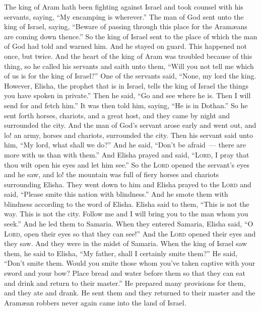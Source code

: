 \begin{inparaenum}
   The king of Aram hath been fighting against Israel and took counsel with his servants, saying, ``My encamping is wherever.''%
   The man of God sent unto the king of Israel, saying, ``Beware of passing through this place for the Aram\ae{}ans are coming down thence.''%
   So the king of Israel sent to the place of which the man of God had told and warned him. And he stayed on guard. This happened not once, but twice.%
   And the heart of the king of Aram was troubled because of this thing, so he called his servants and saith unto them, ``Will you not tell me which of us is for the king of Israel?''%
   One of the servants said, ``None, my lord the king. However, Elisha, the prophet that is in Israel, tells the king of Israel the things you have spoken in private.''%
   Then he said, ``Go and see where he is. Then I will send for and fetch him.'' It was then told him, saying, ``He is in Dothan.''%
   So he sent forth horses, chariots, and a great host, and they came by night and surrounded the city.%
   And the man of God's servant arose early and went out, and lo! an army, horses and chariots, surrounded the city. Then his servant said unto him, ``My lord, what shall we do?''%
   And he said, ``Don't be afraid~--- there are more with us than with them.''%
   And Elisha prayed and said, ``\textsc{Lord}, I pray that thou wilt open his eyes and let him see.'' So the \textsc{Lord} opened the servant's eyes and he saw, and lo! the mountain was full of fiery horses and chariots surrounding Elisha.%
   They went down to him and Elisha prayed to the \textsc{Lord} and said, ``Please smite this nation with blindness.'' And he smote them with blindness according to the word of Elisha.%
   Elisha said to them, ``This is not the way. This is not the city. Follow me and I will bring you to the man whom you seek.'' And he led them to Samaria.%
   When they entered Samaria, Elisha said, ``O \textsc{Lord}, open their eyes so that they can see!'' And the \textsc{Lord} opened their eyes and they saw. And they were in the midst of Samaria.%
   When the king of Israel saw them, he said to Elisha, ``My father, shall I certainly smite them?''%
   He said, ``Don't smite them. Would you smite those whom you've taken captive with your sword and your bow? Place bread and water before them so that they can eat and drink and return to their master.''%
   He prepared many provisions for them, and they ate and drank. He sent them and they returned to their master and the Aram\ae{}an robbers never again came into the land of Israel.%
  

\end{inparaenum}
